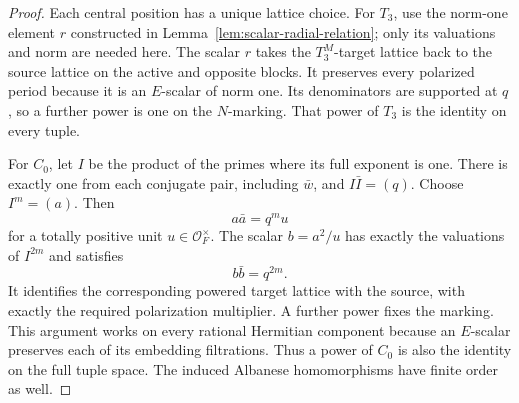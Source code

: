 \begin{proof}
Each central position has a unique lattice choice.  For \(T_3\),
use the norm-one element \(r\) constructed in
Lemma~\ref{lem:scalar-radial-relation}; only its valuations and
norm are needed here.  The scalar \(r\) takes the \(T_3^M\)-target
lattice back to the source lattice on the active and opposite
blocks.  It preserves every polarized period
because it is an \(E\)-scalar of norm one.  Its denominators are
supported at \(q\), so a further power is one on the \(N\)-marking.
That power of \(T_3\) is the identity on every tuple.

For \(C_0\), let \(I\) be the product of the primes where its
full exponent is one.  There is exactly one from each conjugate
pair, including \(\bar w\), and \(I\bar I=(q)\).  Choose
\(I^m=(a)\).  Then
\[
a\bar a=q^m u
\]
for a totally positive unit \(u\in\mathcal O_F^\times\).
The scalar \(b=a^2/u\) has exactly the valuations of \(I^{2m}\)
and satisfies
\[
b\bar b=q^{2m}.
\]
It identifies the corresponding powered target lattice with
the source, with exactly the required polarization multiplier.
A further power fixes the marking.  This argument works on
every rational Hermitian component because an \(E\)-scalar
preserves each of its embedding filtrations.  Thus a power of
\(C_0\) is also the identity on the full tuple space.  The
induced Albanese homomorphisms have finite order as well.
\end{proof}
